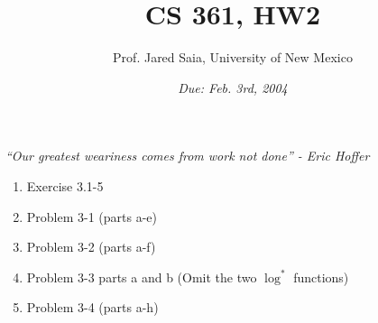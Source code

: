 \documentclass[11pt]{article}
\begin{document}
\title{CS 361, HW2}

\author {Prof. Jared Saia, University of New Mexico}

\date{\emph{Due: Feb. 3rd, 2004}}
\maketitle

\emph{``Our greatest weariness comes from work not done'' - Eric Hoffer} \\

\begin{enumerate}


\item Exercise 3.1-5

\item Problem 3-1 (parts a-e)

\item Problem 3-2 (parts a-f)

\item Problem 3-3 parts a and b (Omit the two $\log^{*}$ functions)

\item Problem 3-4 (parts a-h)

\end{enumerate}
\end{document}
